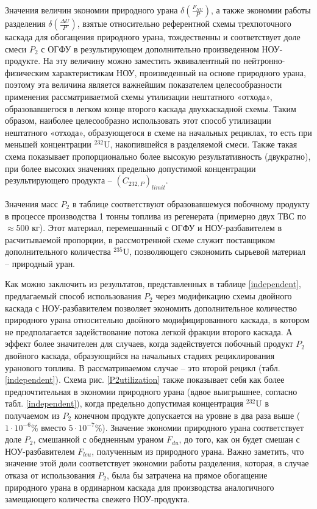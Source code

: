 Значения величин экономии природного урана $\delta(\frac{F_{NU}}{P})$, а также экономии работы разделения $\delta(\frac{\Delta U}{P})$, взятые относительно референтной схемы трехпоточного каскада для обогащения природного урана, тождественны и соответствует доле смеси $P_2$ с ОГФУ в результирующем дополнительно произведенном НОУ-продукте. На эту величину можно заместить эквивалентный по нейтронно-физическим характеристикам НОУ, произведенный на основе природного урана, поэтому эта величина является важнейшим показателем целесообразности применения рассматриваетмой схемы утилизации нештатного «отхода», образовавшегося в легком конце второго каскада двухкаскадной схемы. Таким образом, наиболее целесообразно использовать этот способ утилизации нештатного «отхода», образующегося в схеме на начальных рециклах, то есть при меньшей концентрации $^{232}$U, накопившейся в разделяемой смеси. Также  такая схема показывает пропорционально более высокую результативность (двукратно), при более высоких значениях предельно допустимой концентрации результирующего продукта -- $(C_{232,P})_{limit}$.


Значения масс $P_2$ в таблице соответствуют образовавшемуся побочному продукту в процессе производства 1 тонны топлива из регенерата (примерно двух ТВС по $\approx$500 кг). Этот материал, перемешанный с ОГФУ и НОУ-разбавителем в расчитываемой пропорции, в рассмотренной схеме служит поставщиком дополнительного количества $^{235}$U, позволяющего сэкономить сырьевой материал -- природный уран.

Как можно заключить из результатов, представленных в таблице \ref{independent}, предлагаемый способ использования $P_2$ через модификацию схемы двойного каскада с НОУ-разбавителем позволяет экономить дополнительное количество природного урана относительно двойного модифицированного каскада, в котором не предполагается задействование потока легкой фракции второго каскада. А эффект более значителен для случаев, когда задействуется побочный продукт $P_2$ двойного каскада, образующийся на начальных стадиях рециклирования уранового топлива. В рассматриваемом случае -- это второй рецикл (табл. \ref{independent}). Схема рис. \ref{P2utilization} также показывает себя как более предпочтительная в экономии природного урана (вдвое выигрышнее, согласно табл. \ref{independent}), когда предельно допустимая концентрация $^{232}$U в получаемом из $P_2$ конечном продукте допускается на уровне в два раза выше ($1\cdot10^{-6}$\% вместо $5\cdot10^{-7}$\%).  Значение экономии природного урана соответствует доле $P_2$, смешанной с обедненным ураном $F_{du}$, до того, как он будет смешан с НОУ-разбавителем $F_{leu}$, полученным из природного урана. Важно заметить, что значение этой доли соответствует экономии работы разделения, которая, в случае отказа от использования $P_2$, была бы затрачена на прямое обогащение природного урана в ординарном каскада для производства аналогичного замещающего количества свежего НОУ-продукта.

